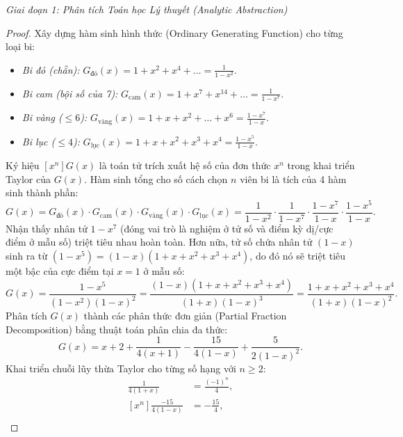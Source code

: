\documentclass{article}
\begin{document}
\vspace{0.5em}\noindent\emph{Giai đoạn 1: Phân tích Toán học Lý thuyết (Analytic Abstraction)}

\begin{proof}
Xây dựng hàm sinh hình thức (Ordinary Generating Function) cho từng loại bi:
\begin{itemize}
    \item \emph{Bi đỏ (chẵn):} $G_{\text{đỏ}}(x) = 1 + x^2 + x^4 + \dots = \frac{1}{1 - x^2}$.
    \item \emph{Bi cam (bội số của 7):} $G_{\text{cam}}(x) = 1 + x^7 + x^{14} + \dots = \frac{1}{1 - x^7}$.
    \item \emph{Bi vàng ($\le 6$):} $G_{\text{vàng}}(x) = 1 + x + x^2 + \dots + x^6 = \frac{1 - x^7}{1 - x}$.
    \item \emph{Bi lục ($\le 4$):} $G_{\text{lục}}(x) = 1 + x + x^2 + x^3 + x^4 = \frac{1 - x^5}{1 - x}$.
\end{itemize}
Ký hiệu $[x^n] G(x)$ là toán tử trích xuất hệ số của đơn thức $x^n$ trong khai triển Taylor của $G(x)$. Hàm sinh tổng cho số cách chọn $n$ viên bi là tích của 4 hàm sinh thành phần:
\begin{equation}
    G(x) = G_{\text{đỏ}}(x) \cdot G_{\text{cam}}(x) \cdot G_{\text{vàng}}(x) \cdot G_{\text{lục}}(x) = \frac{1}{1 - x^2} \cdot \frac{1}{1 - x^7} \cdot \frac{1 - x^7}{1 - x} \cdot \frac{1 - x^5}{1 - x}.
\end{equation}
Nhận thấy nhân tử $1 - x^7$ (đóng vai trò là nghiệm ở tử số và điểm kỳ dị/cực điểm ở mẫu số) triệt tiêu nhau hoàn toàn. Hơn nữa, tử số chứa nhân tử $(1-x)$ sinh ra từ $(1-x^5) = (1-x)(1+x+x^2+x^3+x^4)$, do đó nó sẽ triệt tiêu một bậc của cực điểm tại $x=1$ ở mẫu số:
\begin{equation}
    G(x) = \frac{1 - x^5}{(1 - x^2)(1 - x)^2} = \frac{(1-x)(1+x+x^2+x^3+x^4)}{(1 + x)(1 - x)^3} = \frac{1+x+x^2+x^3+x^4}{(1 + x)(1 - x)^2}.
\end{equation}
Phân tích $G(x)$ thành các phân thức đơn giản (Partial Fraction Decomposition) bằng thuật toán phân chia đa thức:
\begin{equation}
    G(x) = x + 2 + \frac{1}{4(x + 1)} - \frac{15}{4(1 - x)} + \frac{5}{2(1 - x)^2}.
\end{equation}
Khai triển chuỗi lũy thừa Taylor cho từng số hạng với $n \ge 2$:
\begin{align}
    [x^n] \frac{1}{4(1 + x)} &= \frac{(-1)^n}{4}, \\
    [x^n] \frac{-15}{4(1 - x)} &= -\frac{15}{4}, \\

\end{align}
\end{proof}
\end{document}
